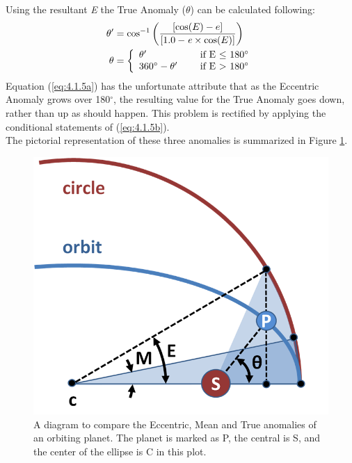 \documentclass[12pt,preprint]{aastex}
\begin{document}
Using the resultant {\it E} the True Anomaly ($\theta$) can be calculated following:
\begin{subequations}
\begin{align}
\label{eq:4.1.5a}
\theta^{\prime}& = \cos^{-1} \bigg( \frac{[\cos(E) - e]}{[1.0 -{\it e}\times \cos(E)]} \bigg)\\
\label{eq:4.1.5b}
\theta& = \left\{ \begin{array}{l l} \theta^{\prime}& \quad \text{ if E $\leq$ 180$^{\circ}$}\\ 360^{\circ}  - \theta^{\prime}& \quad \text{ if E $>$ 180$^{\circ}$} \end{array}\right.
\end{align}
\end{subequations}
Equation (\ref{eq:4.1.5a}) has the unfortunate attribute that as the Eccentric Anomaly grows over 180$^{\circ}$, the resulting value for the True Anomaly goes down, rather than up as should happen.  This problem is rectified by applying the conditional statements of (\ref{eq:4.1.5b}).\\  

The pictorial representation of these three anomalies is summarized in Figure \ref{fig:Anomalies}.

\begin{figure}[ht]
\begin{center}
\includegraphics[scale=0.4]{Figures/Anomalies-MOD.png}
\caption[Diagram of Anomalies]{A diagram to compare the Eccentric, Mean and True anomalies of an orbiting planet.  The planet is marked as P, the central is S, and the center of the ellipse is C in this plot. }
\label{fig:Anomalies}
\end{center}
\end{figure}
\end{document}

